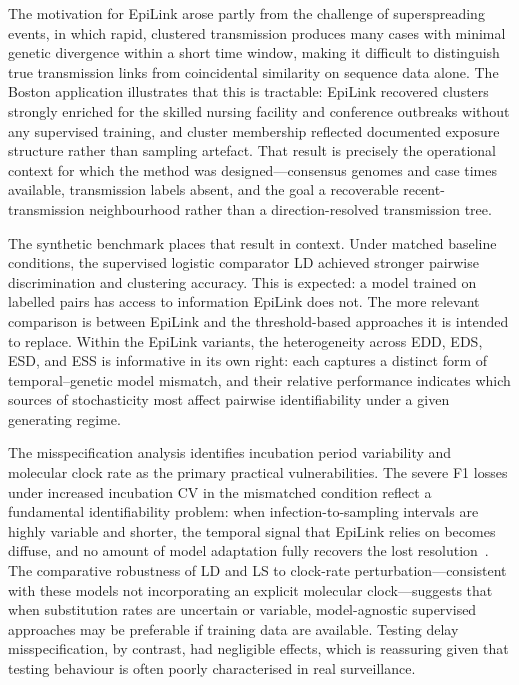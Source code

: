 \documentclass[10pt,letterpaper]{article}
\begin{document}
The motivation for EpiLink arose partly from the challenge of superspreading events, in which rapid, clustered transmission produces many cases with minimal genetic divergence within a short time window, making it difficult to distinguish true transmission links from coincidental similarity on sequence data alone. The Boston application illustrates that this is tractable: EpiLink recovered clusters strongly enriched for the skilled nursing facility and conference outbreaks without any supervised training, and cluster membership reflected documented exposure
structure rather than sampling artefact. That result is precisely the operational context for which the method was designed---consensus genomes and case times available, transmission labels absent, and the goal a recoverable recent-transmission neighbourhood rather than a direction-resolved transmission tree.

The synthetic benchmark places that result in context. Under matched baseline conditions, the supervised logistic comparator LD achieved stronger pairwise discrimination and clustering accuracy. This is expected: a model trained on
labelled pairs has access to information EpiLink does not. The more relevant comparison is between EpiLink and the threshold-based approaches it is intended to replace. Within the EpiLink variants, the heterogeneity across EDD, EDS, ESD, and ESS is informative in its own right: each captures a distinct form of temporal--genetic model mismatch, and their relative performance indicates which sources of stochasticity most affect pairwise identifiability under a given
generating regime.

The misspecification analysis identifies incubation period variability and molecular clock rate as the primary practical vulnerabilities. The severe F1 losses under increased incubation CV in the mismatched condition reflect a fundamental identifiability problem: when infection-to-sampling intervals are highly variable and shorter, the temporal signal that EpiLink relies on becomes diffuse, and no amount of model adaptation fully recovers the lost resolution~\cite{Campbell2018a, VillabonaArenas2020, Duchene2020, Suster2022}. The comparative robustness of LD and LS to clock-rate perturbation---consistent with these models not incorporating an explicit molecular clock---suggests that when
substitution rates are uncertain or variable, model-agnostic supervised approaches may be preferable if training data are available. Testing delay misspecification, by contrast, had negligible effects, which is reassuring given that testing
behaviour is often poorly characterised in real surveillance.
\end{document}

